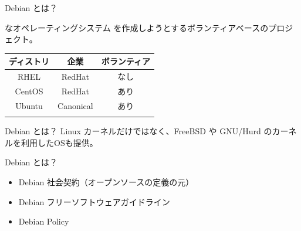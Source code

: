 \begin{frame}{Debian とは？}

{\color{red}{フリー/オープン}}な{\color{red}{ユニバーサル}}オペレーティングシステム を作成しようとするボランティアベースのプロジェクト。

\begin{table}[htb]
  \begin{tabular}{|c|c|c|}
    \hline
    ディストリ & 企業 & ボランティア \\ \hline
    RHEL & RedHat & なし  \\ \hline
    CentOS & RedHat & あり \\ \hline
    Ubuntu  & Canonical & あり \\ \hline
    \color{red}{Debian}  & \color{red}{なし} & \color{red}{あり} \\ \hline
  \end{tabular}
\end{table}

\end{frame}


\begin{frame}{Debian とは？}
Linux カーネルだけではなく、FreeBSD や GNU/Hurd のカーネルを利用したOSも提供。

\begin{center}
\end{center}

\end{frame}


\begin{frame}{Debian とは？}

  \begin{itemize}
  \item Debian 社会契約（オープンソースの定義の元）
  \item Debian フリーソフトウェアガイドライン
  \item Debian Policy
  \end{itemize}

\end{frame}

